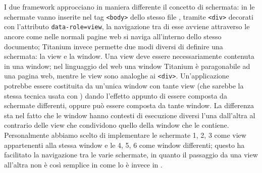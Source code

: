             \noindent I due frame\-work approcciano in maniera differente il concetto di schermata:
            in \kendomob{} le schermate vanno inserite nel tag \verb|<body>| dello stesso
            file \html{}, tramite \verb|<div>| decorati con l'attributo \verb|data-role=view|, la
            navigazione tra di esse avviene attraverso le ancore come nelle normali
            pagine web si naviga all'interno dello stesso documento; Titanium invece
            permette due modi diversi di definire una schermata: la view e la window.
            Una view deve essere necessariamente contenuta in una window; nel linguaggio
            del web una window Titanium è paragonabile ad una pagina web, mentre le view
            sono analoghe ai \verb|<div>|. Un'applicazione potrebbe essere costituita da un'unica
            window con tante view (che sarebbe la stessa tecnica usata con \kendomob{})
            dando l'effetto appunto di essere composta da schermate differenti, oppure
            può essere composta da tante window. La differenza sta nel fatto che
            le window hanno contesti di esecuzione diversi l'una dall'altra al contrario
            delle view che condividono quello della window che le contiene.
            Personalmente abbiamo scelto di implementare le schermate 1, 2, 3 come
            view appartenenti alla stessa window e le 4, 5, 6 come window differenti;
            questo ha facilitato la navigazione tra le varie schermate, in quanto
            il passaggio da una view all'altra non è così semplice in \tisdk{} come
            lo è invece in \kendomob{}.

